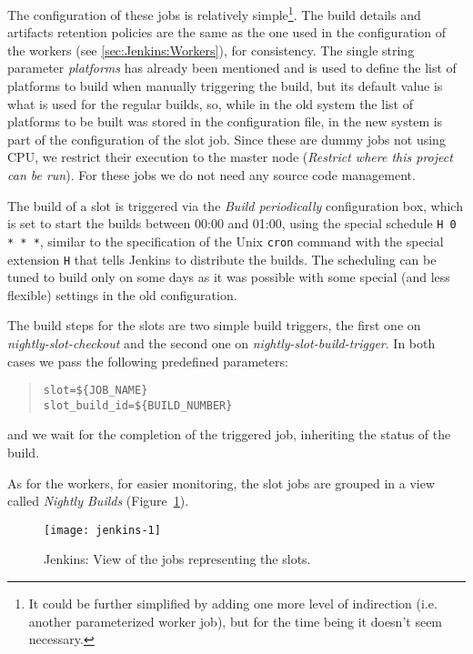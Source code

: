 The configuration of these jobs is relatively simple\footnote{It could be
further simplified by adding one more level of indirection (i.e. another
parameterized worker job), but for the time being it doesn't seem necessary.}.
The build details and artifacts retention policies are the same as the one used
in the configuration of the workers (see \ref{sec:Jenkins:Workers}), for
consistency.  The single string parameter \emph{platforms} has already been
mentioned and is used to define the list of platforms to build when manually
triggering the build, but its default value is what is used for the regular
builds, so, while in the old system the list of platforms to be built was stored
in the configuration file, in the new system is part of the configuration of the
slot job.  Since these are dummy jobs not using CPU, we restrict their execution
to the master node (\emph{Restrict where this project can be run}).  For these
jobs we do not need any source code management.

The build of a slot is triggered via the \emph{Build periodically} configuration
box, which is set to start the builds between 00:00 and 01:00, using the special
schedule \verb|H 0 * * *|, similar to the specification of the Unix
\texttt{cron} command with the special extension \texttt{H} that tells Jenkins
to distribute the builds.  The scheduling can be tuned to build only on some
days as it was possible with some special (and less flexible) settings in the
old configuration.

The build steps for the slots are two simple build triggers, the first one on
\emph{nightly-slot-checkout} and the second one on
\emph{nightly-slot-build-trigger}.  In both cases we pass the following
predefined parameters:
\begin{quote}
\begin{verbatim}
slot=${JOB_NAME}
slot_build_id=${BUILD_NUMBER}
\end{verbatim}
\end{quote}
and we wait for the completion of the triggered job, inheriting the status of
the build.

As for the workers, for easier monitoring, the slot jobs are grouped in a view
called \emph{Nightly Builds} (Figure~\ref{fig:jenkins-slots}).

\begin{figure}
  \begin{center}
    \texttt{[image: jenkins-1]}
  \end{center}
  \caption{Jenkins: View of the jobs representing the slots.}
  \label{fig:jenkins-slots}
\end{figure}


